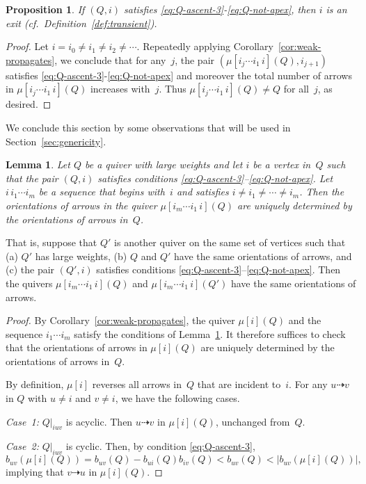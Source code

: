 \documentclass[11pt, letterpaper]{amsart}
\newtheorem{proposition}[theorem]{Proposition}
\newtheorem{lemma}[theorem]{Lemma}
\theoremstyle{definition}
\numberwithin{equation}{section}
\newcommand{\T}[2]{\mu[#1](#2)} %
\newcommand{\points}{\!\dasharrow\!}
\begin{document}
\pagebreak[3]

\begin{proposition}
\label{pr:weak-is-exit}
If $(Q,i)$ satisfies \eqref{eq:Q-ascent-3}-\eqref{eq:Q-not-apex}, then $i$ is an exit (cf.\ Definition~\ref{def:transient}).
\end{proposition}

\begin{proof}
Let $i=i_0\neq i_1\neq i_2\neq\cdots$. 
Repeatedly applying Corollary~\ref{cor:weak-propagates}, we conclude that for any~$j$,
the pair $(\T{i_j \cdots i_1\,i}{Q}, i_{j+1})$ satisfies \eqref{eq:Q-ascent-3}-\eqref{eq:Q-not-apex} 
and moreover the total number of arrows in $\T{i_j \cdots i_1\,i}{Q}$ increases with~$j$.
Thus $\T{i_j \cdots i_1\,i}{Q}\neq Q$ for all~$j$, as desired. 
\end{proof}

We conclude this section by some observations that will be used in Section~\ref{sec:genericity}. 

\begin{lemma}
\label{lem:orientations-fixed}
Let $Q$ be a quiver with large weights and let $i$ be a vertex in~$Q$
such that the pair $(Q, i)$ satisfies conditions \eqref{eq:Q-ascent-3}--\eqref{eq:Q-not-apex}. 
Let $i\,i_1\cdots i_m$ be a sequence that begins with~$i$
and satisfies $i\neq i_1\neq \cdots\neq i_m$. 
Then the orientations of arrows in the quiver $\T{i_m\cdots i_1\,i}{Q}$ are uniquely determined by 
the orientations of arrows in~$Q$. 
\end{lemma}

That is, suppose that $Q'$ is another quiver on the same set of vertices such that \linebreak[3]
(a) $Q'$ has large weights, (b) $Q$ and $Q'$ have the same orientations of arrows, 
and \linebreak[3]
(c) the pair $(Q',i)$ satisfies conditions \eqref{eq:Q-ascent-3}--\eqref{eq:Q-not-apex}. 
Then the quivers $\T{i_m\cdots i_1\,i}{Q}$ and $\T{i_m\cdots i_1\,i}{Q'}$
have the same orientations of arrows. 

\begin{proof}
By Corollary~\ref{cor:weak-propagates}, the quiver $\mu[i](Q)$ and the sequence $i_1\cdots i_m$ satisfy 
the conditions of Lemma~\ref{lem:orientations-fixed}. 
It therefore suffices to check that the orientations of arrows in $\mu[i](Q)$ are uniquely determined by 
the orientations of arrows in~$Q$. 

By definition, $\mu[i]$ reverses all arrows in~$Q$ that are incident to~$i$. 
For any $u \points v$  in $Q$ with $u\neq i$ and $v\neq i$, we have the following cases. 

\noindent
\emph{Case~1:} $Q|_{iuv}$ is acyclic.
Then $u \points v$ in $\T{i}{Q}$, unchanged from~$Q$. 

\noindent
\emph{Case~2:} $Q|_{iuv}$ is cyclic.
Then, by condition \eqref{eq:Q-ascent-3}, 
\begin{equation*}
b_{uv}(\mu[i](Q)) = b_{uv}(Q) - b_{ui}(Q) b_{iv}(Q) < b_{uv}(Q) < |b_{uv}(\mu[i](Q))|, 
\end{equation*}
implying that $v\points u$ in $\T{i}{Q}$. 
\end{proof}
\end{document}
